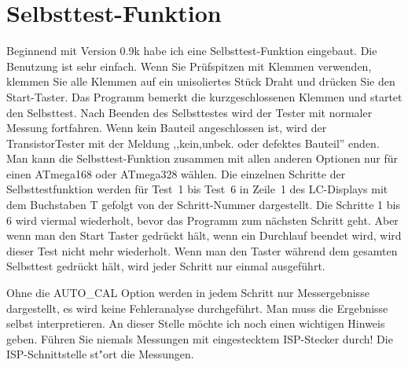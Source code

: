 
\section{Selbsttest-Funktion}
\label{sec:selftest}
Beginnend mit Version 0.9k habe ich eine Selbsttest-Funktion eingebaut.
Die Benutzung ist sehr einfach.
Wenn Sie Prüfspitzen mit Klemmen verwenden, klemmen Sie alle Klemmen auf ein unisoliertes Stück Draht und drücken Sie
den Start-Taster.
Das Programm bemerkt die kurzgeschlossenen Klemmen und startet den Selbsttest.
Nach Beenden des Selbsttestes wird der Tester mit normaler Messung fortfahren.
Wenn kein Bauteil angeschlossen ist, wird der TransistorTester mit der
Meldung ,,kein,unbek. oder defektes Bauteil'' enden.
Man kann die Selbsttest-Funktion zusammen mit allen anderen Optionen nur für einen ATmega168
oder ATmega328 wählen.
Die einzelnen Schritte der Selbsttestfunktion werden für Test~1 bis Test~6 in Zeile~1 des LC-Displays mit dem Buchstaben T
gefolgt von der Schritt-Nummer dargestellt.
Die Schritte 1 bis 6 wird viermal wiederholt, bevor das Programm zum nächsten Schritt geht.
Aber wenn man den Start Taster gedrückt hält, wenn ein Durchlauf beendet wird, wird dieser Test nicht
mehr wiederholt.
Wenn man den Taster während dem gesamten Selbsttest gedrückt hält, wird jeder Schritt nur einmal ausgeführt.

Ohne die AUTO\_CAL Option werden in jedem Schritt nur Messergebnisse dargestellt, es wird keine Fehleranalyse durchgeführt.
Man  muss die Ergebnisse selbst interpretieren.
An dieser Stelle möchte ich noch einen wichtigen Hinweis geben. Führen Sie niemals Messungen mit
eingestecktem ISP-Stecker durch!
Die ISP-Schnittstelle st"ort die Messungen.

